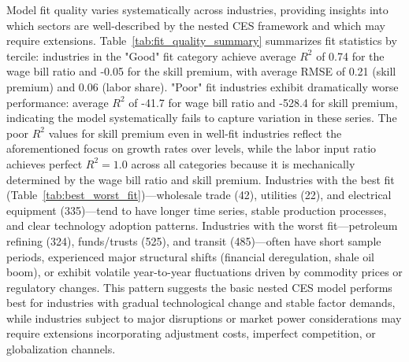 \documentclass[12pt]{article}
\begin{document}
Model fit quality varies systematically across industries, providing insights into which sectors are well-described by the nested CES framework and which may require extensions. Table~\ref{tab:fit_quality_summary} summarizes fit statistics by tercile: industries in the "Good" fit category achieve average $R^2$ of 0.74 for the wage bill ratio and -0.05 for the skill premium, with average RMSE of 0.21 (skill premium) and 0.06 (labor share). "Poor" fit industries exhibit dramatically worse performance: average $R^2$ of -41.7 for wage bill ratio and -528.4 for skill premium, indicating the model systematically fails to capture variation in these series. The poor $R^2$ values for skill premium even in well-fit industries reflect the aforementioned focus on growth rates over levels, while the labor input ratio achieves perfect $R^2 = 1.0$ across all categories because it is mechanically determined by the wage bill ratio and skill premium. Industries with the best fit (Table~\ref{tab:best_worst_fit})---wholesale trade (42), utilities (22), and electrical equipment (335)---tend to have longer time series, stable production processes, and clear technology adoption patterns. Industries with the worst fit---petroleum refining (324), funds/trusts (525), and transit (485)---often have short sample periods, experienced major structural shifts (financial deregulation, shale oil boom), or exhibit volatile year-to-year fluctuations driven by commodity prices or regulatory changes. This pattern suggests the basic nested CES model performs best for industries with gradual technological change and stable factor demands, while industries subject to major disruptions or market power considerations may require extensions incorporating adjustment costs, imperfect competition, or globalization channels.




\end{document}
